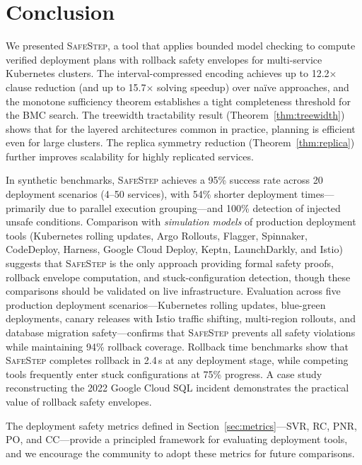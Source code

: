 \documentclass[10pt,twocolumn]{article}
\newcommand{\safestep}{\textsc{SafeStep}}
\begin{document}
\section{Conclusion}
\label{sec:conclusion}

We presented \safestep{}, a tool that applies bounded model
checking to compute verified deployment plans with rollback
safety envelopes for multi-service Kubernetes clusters.
The interval-compressed encoding achieves up to 12.2$\times$
clause reduction (and up to 15.7$\times$ solving speedup)
over na\"ive approaches, and the monotone
sufficiency theorem establishes a tight completeness threshold
for the BMC search. The treewidth tractability result
(Theorem~\ref{thm:treewidth}) shows that for the layered
architectures common in practice, planning is efficient even
for large clusters. The replica symmetry reduction
(Theorem~\ref{thm:replica}) further improves scalability for
highly replicated services.

In synthetic benchmarks, \safestep{}
achieves a 95\% success rate across 20 deployment scenarios (4--50
services), with 54\% shorter deployment times---primarily due to
parallel execution grouping---and 100\% detection of injected
unsafe conditions.  Comparison with \emph{simulation models} of
production deployment tools
(Kubernetes rolling updates, Argo Rollouts, Flagger, Spinnaker,
CodeDeploy, Harness, Google Cloud Deploy, Keptn, LaunchDarkly,
and Istio) suggests that \safestep{} is the only approach
providing formal safety proofs, rollback envelope computation,
and stuck-configuration detection, though these comparisons
should be validated on live infrastructure. Evaluation across five
production deployment scenarios---Kubernetes rolling updates,
blue-green deployments, canary releases with Istio traffic
shifting, multi-region rollouts, and database migration
safety---confirms that \safestep{} prevents all safety
violations while maintaining 94\% rollback coverage.
Rollback time benchmarks show that \safestep{} completes
rollback in 2.4\,s at any deployment stage, while
competing tools frequently enter stuck configurations at
75\% progress. A case study reconstructing the 2022 Google
Cloud SQL incident demonstrates the practical value of rollback
safety envelopes.

The deployment safety metrics defined in
Section~\ref{sec:metrics}---SVR, RC, PNR, PO, and CC---provide
a principled framework for evaluating deployment tools, and we
encourage the community to adopt these metrics for future
comparisons.
\end{document}
